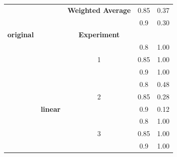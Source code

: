 \documentclass{mpaper}
\begin{document}
\begin{table}[]
\begin{tabular}{|l|c|ccc|}
                                            &                 & \multicolumn{1}{c|}{\textbf{Weighted Average}} & \multicolumn{1}{c|}{0.85}               & 0.37               \\
                                            &                 & \multicolumn{1}{l|}{}                          & \multicolumn{1}{c|}{0.9}                & 0.30               \\ \cline{2-5} 
\multicolumn{1}{|c|}{\textbf{original}}     &                 & \multicolumn{1}{c|}{\textbf{Experiment}}       & \multicolumn{1}{c|}{\textbf{}}          & \textbf{}          \\ \cline{3-5} 
                                            &                 & \multicolumn{1}{c|}{}                          & \multicolumn{1}{c|}{0.8}                & 1.00               \\
                                            &                 & \multicolumn{1}{c|}{1}                         & \multicolumn{1}{c|}{0.85}               & 1.00               \\
                                            &                 & \multicolumn{1}{c|}{}                          & \multicolumn{1}{c|}{0.9}                & 1.00               \\ \cline{3-5} 
                                            &                 & \multicolumn{1}{c|}{}                          & \multicolumn{1}{c|}{0.8}                & 0.48               \\
                                            &                 & \multicolumn{1}{c|}{2}                         & \multicolumn{1}{c|}{0.85}               & 0.28               \\
                                            & \textbf{linear} & \multicolumn{1}{c|}{}                          & \multicolumn{1}{c|}{0.9}                & 0.12               \\ \cline{3-5} 
                                            &                 & \multicolumn{1}{c|}{}                          & \multicolumn{1}{c|}{0.8}                & 1.00               \\
                                            &                 & \multicolumn{1}{c|}{3}                         & \multicolumn{1}{c|}{0.85}               & 1.00               \\
                                            &                 & \multicolumn{1}{c|}{}                          & \multicolumn{1}{c|}{0.9}                & 1.00               \\ \cline{3-5} 

\end{tabular}
\end{table}
\end{document}
